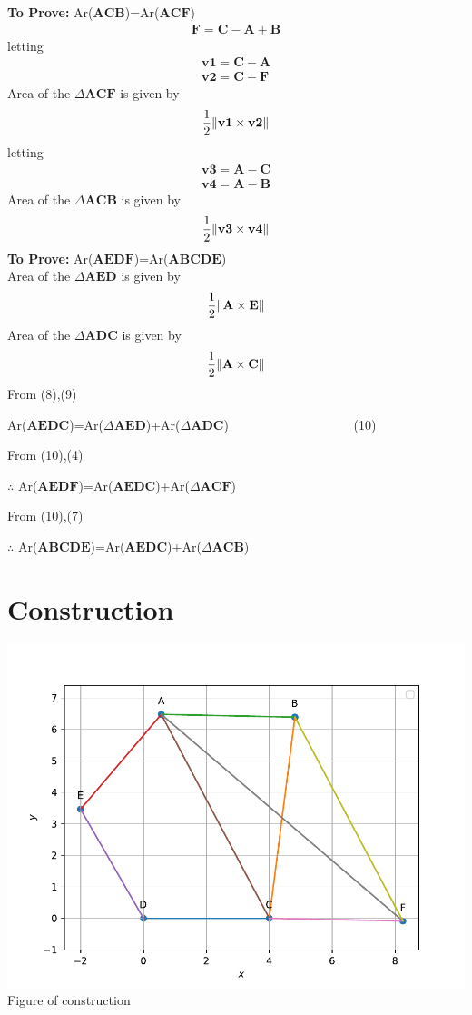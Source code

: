 \documentclass[10pt, a4paper]{article}
\let\vec\mathbf
\begin{document}
\textbf{To Prove:} Ar($\vec{A}\vec{C}\vec{B}$)=Ar($\vec{A}\vec{C}\vec{F}$)
\begin{align}
\vec{F}=\vec{C}-\vec{A}+\vec{B}\end{align}
letting
\begin{align}
\vec{v1}=\vec{C}-\vec{A}\\ \vec{v2}=\vec{C}-\vec{F}
\end{align}
Area of the $\Delta \vec{A}\vec{C}\vec{F}$ is given by
\begin{align}
\frac{1}{2} \norm{\vec{v1}\times\vec{v2}}
\end{align}
letting
\begin{align}\vec{v3}=\vec{A}-\vec{C}\\ 
\vec{v4}=\vec{A}-\vec{B}
\end{align}
Area of the $\Delta \vec{A}\vec{C}\vec{B}$ is given by
\begin{align}
\frac{1}{2} \norm{\vec{v3}\times\vec{v4}}
\end{align}
\textbf{To Prove:}  Ar($\vec{A}\vec{E}\vec{D}\vec{F}$)=Ar($\vec{A}\vec{B}\vec{C}\vec{D}\vec{E}$) \\
Area of the $\Delta \vec{A}\vec{E}\vec{D}$ is given by
\begin{align}
\frac{1}{2} \norm{\vec{A}\times\vec{E}}
\end{align}
Area of the $\Delta \vec{A}\vec{D}\vec{C}$ is given by
\begin{align}
\frac{1}{2} \norm{\vec{A}\times\vec{C}}
\end{align}
From (8),(9)
\begin{center}
  Ar($\vec{A}\vec{E}\vec{D}\vec{C}$)=Ar($\Delta$$\vec{A}\vec{E}\vec{D}$)+Ar($\Delta$$\vec{A}\vec{D}\vec{C}$)     \ \ \ \ \ \ \ \ \ \  \ \ \ \ \ \ \ \ \ (10)   
\end{center}
 From (10),(4)
 \begin{center}
$\therefore$ Ar($\vec{A}\vec{E}\vec{D}\vec{F}$)=Ar($\vec{A}\vec{E}\vec{D}\vec{C}$)+Ar($\Delta$$\vec{A}\vec{C}\vec{F}$)
\end{center}
 From (10),(7)
 \begin{center}
$\therefore$ Ar($\vec{A}\vec{B}\vec{C}\vec{D}\vec{E}$)=Ar($\vec{A}\vec{E}\vec{D}\vec{C}$)+Ar($\Delta$$\vec{A}\vec{C}\vec{B}$)
\end{center}
 \section{Construction}
 	\begin{center}
  \includegraphics[scale=0.39]{matrix.pdf}\\
       Figure of construction 
  	\end{center}
\end{document}
